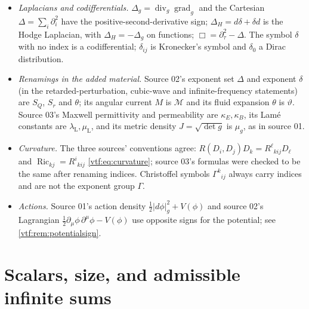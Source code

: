 \documentclass[11pt,letterpaper]{article}
\theoremstyle{definition}
\theoremstyle{remark}
\newcommand{\A}{\mathscr A}\newcommand{\OO}{\mathcal O}\newcommand{\mm}{\mathfrak m}
\newcommand{\Ric}{\operatorname{Ric}}\newcommand{\Scal}{\operatorname{Scal}}
\newcommand{\grad}{\operatorname{grad}}\newcommand{\Div}{\operatorname{div}}
\newcommand{\abs}[1]{\lvert#1\rvert}\newcommand{\norm}[1]{\lVert#1\rVert}
\begin{document}
\begin{itemize}
(source 02's term) is an element of $\A_\Gamma(U)$, with one well-ordered
support on all of $U$. An \emph{admissible} metric has determinant a unit of the
coefficient algebra (\cref{vtf:sec:metric}). A \emph{regular} metric is $g_0+h$
with $g_0$ real and nondegenerate of any signature and $h$ of positive support
\eqref{vtf:eq:regularmetric}. A \emph{regular Riemannian} metric (source 03's
``regular Hahn metric'') is a regular metric with $g_0$ positive definite.
``Positive support'' always means support in $\Gamma_{>0}$; ``positive'' for a
scalar, a form or a density refers to the order of $K$.
\item \emph{Laplacians and codifferentials.} $\Delta_g=\Div_g\grad_g$ and the
Cartesian $\Delta=\sum_i\partial_i^2$ have the positive-second-derivative sign;
$\Delta_H=d\delta+\delta d$ is the Hodge Laplacian, with $\Delta_H=-\Delta_g$ on
functions; $\Box=\partial_\tau^2-\Delta$. The symbol $\delta$ with no index is a
codifferential; $\delta_{ij}$ is Kronecker's symbol and $\delta_0$ a Dirac
distribution.
\item \emph{Renamings in the added material.} Source 02's exponent set $\Delta$
and exponent $\delta$ (in the retarded-perturbation, cubic-wave and
infinite-frequency statements) are $S_Q$, $S_r$ and $\theta$; its angular
current $M$ is $\mathcal M$ and its fluid expansion $\theta$ is $\vartheta$.
Source 03's Maxwell permittivity and permeability are $\kappa_E,\kappa_B$, its
Lam\'e constants are $\lambda_{\mathrm L},\mu_{\mathrm L}$, and its metric
density $J=\sqrt{\det g}$ is $\mu_g$, as in source 01.
\item \emph{Curvature.} The three sources' conventions agree:
$R(D_i,D_j)D_k=R^\ell{}_{kij}D_\ell$ and $\Ric_{kj}=R^i{}_{kij}$
\eqref{vtf:eq:curvature}; source 03's formulas were checked to be the same after
renaming indices. Christoffel symbols $\Gamma^k{}_{ij}$ always carry indices and
are not the exponent group $\Gamma$.
\item \emph{Actions.} Source 01's action density $\tfrac12\abs{d\phi}_g^2+V(\phi)$
and source 02's Lagrangian $\tfrac12\partial_\mu\phi\,\partial^\mu\phi-V(\phi)$
use opposite signs for the potential; see \cref{vtf:rem:potentialsign}.
\end{itemize}

\section{Scalars, size, and admissible infinite sums}\label{vtf:sec:scalars}
\end{document}
